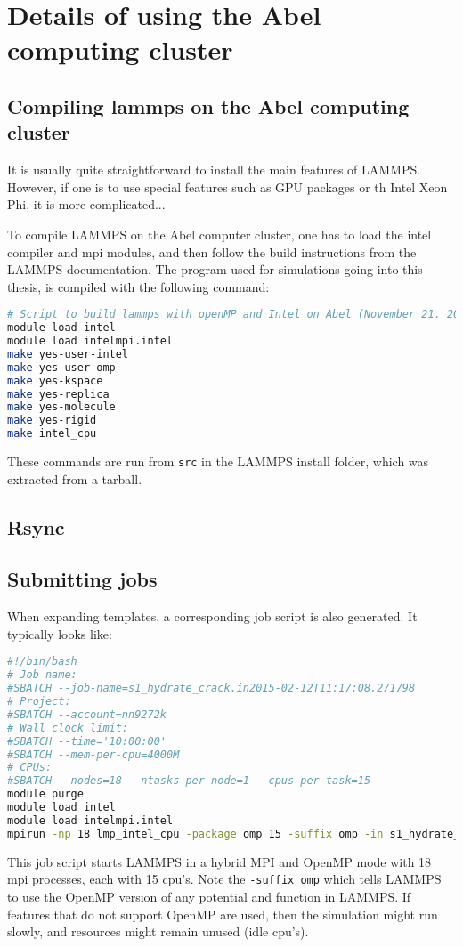 \chapter{Details of using the Abel computing cluster}

\section{Compiling lammps on the Abel computing cluster}
It is usually quite straightforward to install the main features of LAMMPS. However, if one is to use special features such as GPU packages or th Intel Xeon Phi, it is more complicated... 	

To compile LAMMPS on the Abel computer cluster, one has to load the intel compiler and mpi modules, and then follow the build instructions from the LAMMPS documentation. The program used for simulations going into this thesis, is compiled with the following command:
\begin{lstlisting}[language=Bash]
# Script to build lammps with openMP and Intel on Abel (November 21. 2014)
module load intel
module load intelmpi.intel
make yes-user-intel
make yes-user-omp
make yes-kspace
make yes-replica
make yes-molecule
make yes-rigid
make intel_cpu
\end{lstlisting}
These commands are run from {\tt src} in the LAMMPS install folder, which was extracted from a tarball.

\section{Rsync}

\section{Submitting jobs}
When expanding templates, a corresponding job script is also generated. It typically looks like:
\begin{lstlisting}[language=Bash]
#!/bin/bash
# Job name:
#SBATCH --job-name=s1_hydrate_crack.in2015-02-12T11:17:08.271798
# Project: 
#SBATCH --account=nn9272k
# Wall clock limit:
#SBATCH --time='10:00:00'
#SBATCH --mem-per-cpu=4000M
# CPUs:
#SBATCH --nodes=18 --ntasks-per-node=1 --cpus-per-task=15
module purge
module load intel
module load intelmpi.intel
mpirun -np 18 lmp_intel_cpu -package omp 15 -suffix omp -in s1_hydrate_crack.in
\end{lstlisting}

This job script starts LAMMPS in a hybrid MPI and OpenMP mode with 18 mpi processes, each with 15 cpu's. Note the {\tt -suffix omp} which tells LAMMPS to use the OpenMP version of any potential and function in LAMMPS. If features that do not support OpenMP are used, then the simulation might run slowly, and resources might remain unused (idle cpu's).

